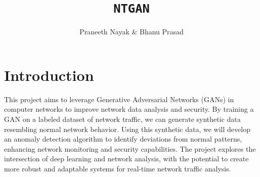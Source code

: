 \documentclass[12pt]{article}
\begin{document}
\title{\texttt{NTGAN}}
\author{Praneeth Nayak \& Bhanu Prasad}

\maketitle

\section{Introduction}
This project aims to leverage Generative Adversarial Networks (GANs)
 in computer networks to improve network data analysis and security.
 By training a GAN on a labeled dataset of network traffic, we can 
 generate synthetic data resembling normal network behavior. Using
 this synthetic data, we will develop an anomaly detection algorithm
 to identify deviations from normal patterns, enhancing network
 monitoring and security capabilities. The project explores the 
 intersection of deep learning and network analysis, with the potential 
 to create more robust and adaptable systems for real-time network traffic analysis.
\end{document}
